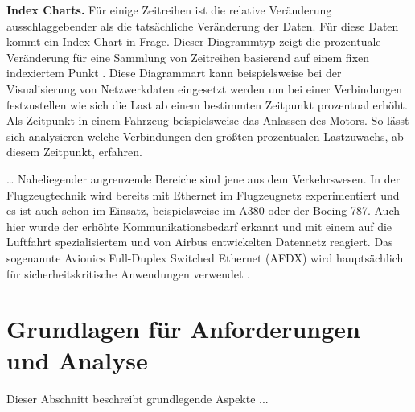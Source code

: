 \documentclass[draft=false
              ,paper=a4
              ,twoside=false
              ,fontsize=11pt
              ,headsepline
              ,BCOR10mm
              ,DIV11
              ]{scrbook}
\begin{document}
\textbf{Index Charts.} Für einige Zeitreihen ist die relative Veränderung ausschlaggebender als die tatsächliche Veränderung der Daten. Für diese Daten kommt ein Index Chart in Frage. Dieser Diagrammtyp zeigt die prozentuale Veränderung für eine Sammlung von Zeitreihen basierend auf einem fixen indexiertem Punkt \cite{heer_tour_2010}. Diese Diagrammart kann beispielsweise bei der Visualisierung von Netzwerkdaten eingesetzt werden um bei einer Verbindungen festzustellen wie sich die Last ab einem bestimmten Zeitpunkt prozentual erhöht. Als Zeitpunkt in einem Fahrzeug beispielsweise das Anlassen des Motors. So lässt sich analysieren welche Verbindungen den größten prozentualen Lastzuwachs, ab diesem Zeitpunkt, erfahren.

\ldots
Naheliegender angrenzende Bereiche sind jene aus dem Verkehrswesen. In der Flugzeugtechnik wird bereits mit Ethernet im Flugzeugnetz experimentiert und es ist auch schon im Einsatz, beispielsweise im A380 oder der Boeing 787. Auch hier wurde der erhöhte Kommunikationsbedarf erkannt und mit einem auf die Luftfahrt spezialisiertem und von Airbus entwickelten Datennetz reagiert. Das sogenannte Avionics Full-Duplex Switched Ethernet (AFDX) wird hauptsächlich für sicherheitskritische Anwendungen verwendet \cite{steiner_recent_2014}. 



\section{Grundlagen für Anforderungen und Analyse} %
\label{sec:anforderungen_und_analyse}
Dieser Abschnitt beschreibt grundlegende Aspekte ... 
\end{document}
